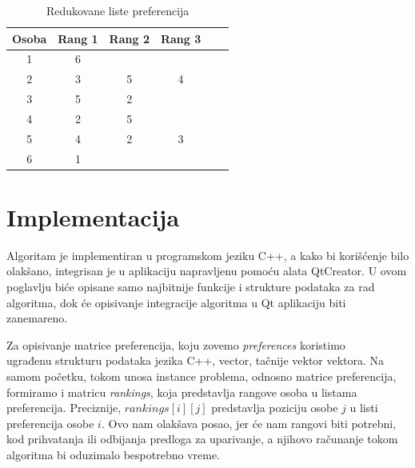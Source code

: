 \documentclass[a4paper]{article}
\begin{document}
\begin{table}[h]
    \centering
    \begin{tabular}{|c|c|c|c|c|c|}
        \hline
        Osoba & Rang 1 & Rang 2 & Rang 3\\ \hline
        1 & 6 &  &  \\ \hline
        2 & 3 & 5 & 4 \\ \hline
        3 & 5 & 2 & \\ \hline
        4 & 2 & 5 & \\ \hline
        5 & 4 & 2 & 3 \\ \hline
        6 & 1 &  & \\ \hline
    \end{tabular}
    \caption{Redukovane liste preferencija}
    \label{redukovane}
\end{table}

\newpage
\section{Implementacija}
Algoritam je implementiran u programskom jeziku C++, a kako bi korišćenje bilo olakšano, integrisan je u aplikaciju napravljenu pomoću alata QtCreator. U ovom poglavlju biće opisane samo najbitnije funkcije i strukture podataka za rad algoritma, dok će opisivanje integracije algoritma u Qt aplikaciju biti zanemareno.


Za opisivanje matrice preferencija, koju zovemo \textit{preferences} koristimo \\ ugrađenu strukturu podataka jezika C++, vector, tačnije vektor vektora. Na samom početku, tokom unosa instance problema, odnosno matrice preferencija, formiramo i matricu \textit{rankings}, koja predstavlja rangove osoba u listama preferencija. Preciznije, $rankings[i][j]$ predstavlja poziciju osobe $j$ u listi preferencija osobe $i$. Ovo nam olakšava posao, jer će nam rangovi biti potrebni, kod prihvatanja ili odbijanja predloga za uparivanje, a njihovo računanje tokom algoritma bi oduzimalo bespotrebno vreme.
\end{document}
